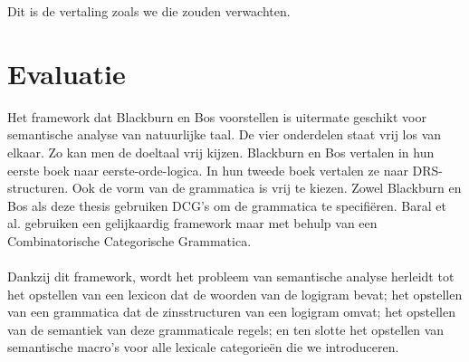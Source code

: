 Dit is de vertaling zoals we die zouden verwachten.

\section{Evaluatie}
Het framework dat Blackburn en Bos voorstellen is uitermate geschikt voor semantische analyse van natuurlijke taal. De vier onderdelen staat vrij los van elkaar. Zo kan men de doeltaal vrij kijzen. Blackburn en Bos vertalen in hun eerste boek \cite{Blackburn2005} naar eerste-orde-logica. In hun tweede boek \cite{Blackburn2006} vertalen ze naar DRS-structuren. Ook de vorm van de grammatica is vrij te kiezen. Zowel Blackburn en Bos als deze thesis gebruiken DCG's om de grammatica te specifiëren. Baral et al. \cite{Baral2008} gebruiken een gelijkaardig framework maar met behulp van een Combinatorische Categorische Grammatica.

\paragraph{} Dankzij dit framework, wordt het probleem van semantische analyse herleidt tot het opstellen van een lexicon dat de woorden van de logigram bevat; het opstellen van een grammatica dat de zinsstructuren van een logigram omvat; het opstellen van de semantiek van deze grammaticale regels; en ten slotte het opstellen van semantische macro's voor alle lexicale categorieën die we introduceren.

